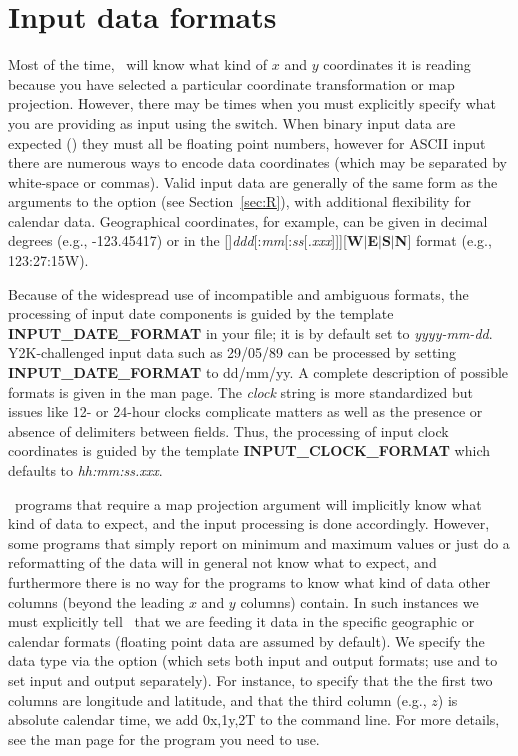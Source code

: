 \section{Input data formats}
\label{sec:input data}

Most of the time, \GMT\ will know what kind of $x$ and $y$ coordinates it is reading because you have selected
a particular coordinate transformation or map projection.  However,
there may be times when you must explicitly specify what you are
providing as input using the  switch. When binary input data are expected () they must all
be floating point numbers, however for ASCII input there are numerous
ways to encode data coordinates (which may be separated by white-space or commas).  Valid input data are generally
of the same form as the arguments to the  option (see Section~\ref{sec:R}), with additional
flexibility for calendar data.  Geographical coordinates, for example, can be given in decimal degrees
(e.g., -123.45417) or in the
[\PM]\emph{ddd}[:\emph{mm}[:\emph{ss}[\emph{.xxx}]]][\textbf{W}$|$\textbf{E}$|$\textbf{S}$|$\textbf{N}]
format (e.g., 123:27:15W).

Because of the widespread use of incompatible and ambiguous formats, the processing of input
date components is guided by the template \textbf{INPUT\_DATE\_FORMAT} in your
 file; it is by default set to \emph{yyyy-mm-dd}.  Y2K-challenged input data such as
29/05/89 can be processed by setting \textbf{INPUT\_DATE\_FORMAT}
to dd/mm/yy.  A complete description of possible formats is given in the 
man page.  The \emph{clock} string is more standardized but issues like 12- or 24-hour clocks complicate matters
as well as the presence or absence of delimiters between fields.  Thus, the processing of input
clock coordinates is guided by the template \textbf{INPUT\_CLOCK\_FORMAT} which defaults to \emph{hh:mm:ss.xxx}.

\GMT\ programs that require a map projection argument will implicitly know what kind of data to expect, and the
input processing is done accordingly.  However, some programs that simply report on minimum and maximum
values or just do a reformatting of the data will in general not know what to expect, and furthermore there is
no way for the programs to know what kind of data other columns (beyond the leading $x$ and $y$ columns) contain.
In such instances we must
explicitly tell \GMT\ that we are feeding it data in the specific geographic or calendar formats (floating point
data are assumed by default).  We specify the data type via the  option (which sets both input and output
formats; use  and  to set input and output separately).  For instance, to specify that the
the first two columns are longitude and latitude, and that the third column (e.g., $z$) is absolute calendar time, we add
0x,1y,2T to the command line.  For more details, see the man page for the program you need to use.

